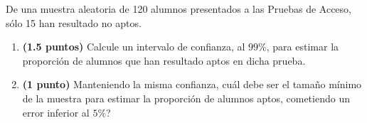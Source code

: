 
De una muestra aleatoria de 120 alumnos presentados a las Pruebas de Acceso, sólo 15 han resultado no aptos.
\begin{enumerate}[label=\alph*)]
\item \textbf{(1.5 puntos)} Calcule un intervalo de confianza, al $99\%$, para estimar la proporción de alumnos que han resultado aptos en dicha prueba.
\item \textbf{(1 punto)} Manteniendo la misma confianza, \textquestiondown{}cuál debe ser el tamaño mínimo de la muestra para estimar la proporción de alumnos aptos, cometiendo un error inferior al $5\%$?
\end{enumerate}
